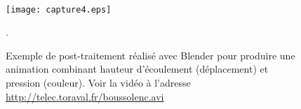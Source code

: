 \documentclass[12pt,oneside]{paper}
\begin{document}
\newpage

~\vfill

\begin{figure}[!h]
\begin{center}
\texttt{[image: capture4.eps]}
\caption{Exemple de post-traitement réalisé avec Blender pour produire une animation combinant hauteur d'écoulement (déplacement) et pression (couleur). Voir la vidéo à l'adresse \href{http://telec.toraval.fr/boussolenc.avi}{http://telec.toraval.fr/boussolenc.avi}}.
\label{fig:blend}
\end{center}
\end{figure}

~\vfill
\end{document}
